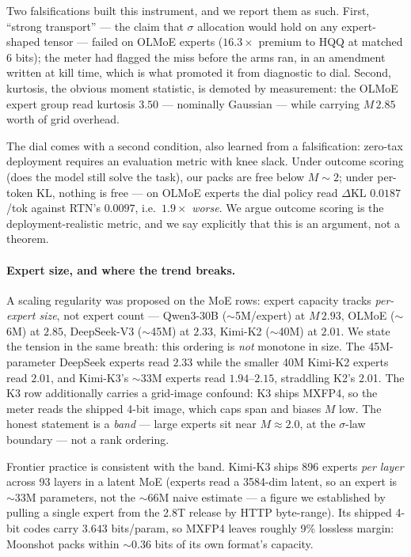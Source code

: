 \documentclass[11pt]{article}
\newcommand{\dkl}{\ensuremath{\Delta\mathrm{KL}}}
\begin{document}
Two falsifications built this instrument, and we report them as such. First,
``strong transport'' --- the claim that $\sigma$ allocation would hold on any
expert-shaped tensor --- failed on OLMoE experts ($16.3\times$ premium to HQQ at
matched 6 bits); the meter had flagged the miss before the arms ran, in an
amendment written at kill time, which is what promoted it from diagnostic to
dial. %
Second, kurtosis, the obvious moment statistic, is demoted by measurement: the
OLMoE expert group read kurtosis $3.50$ --- nominally Gaussian --- while
carrying $M\,2.85$ worth of grid overhead. %

The dial comes with a second condition, also learned from a falsification:
zero-tax deployment requires an evaluation metric with knee slack. Under outcome
scoring (does the model still solve the task), our packs are free below
$M \sim 2$; under per-token KL, nothing is free --- on OLMoE experts the dial
policy read \dkl{} $0.0187$/tok against RTN's $0.0097$, i.e.\ $1.9\times$
\emph{worse}. %
We argue outcome scoring is the deployment-realistic metric, and we say
explicitly that this is an argument, not a theorem.

\paragraph{Expert size, and where the trend breaks.}
A scaling regularity was proposed on the MoE rows: expert capacity tracks
\emph{per-expert size}, not expert count --- Qwen3-30B ($\sim$5M/expert) at
$M\,2.93$, OLMoE ($\sim$6M) at $2.85$, DeepSeek-V3 ($\sim$45M) at $2.33$,
Kimi-K2 ($\sim$40M) at $2.01$. %
We state the tension in the same breath: this ordering is \emph{not} monotone in
size. The 45M-parameter DeepSeek experts read $2.33$ while the smaller 40M
Kimi-K2 experts read $2.01$, and Kimi-K3's $\sim$33M experts read
$1.94$--$2.15$, straddling K2's 2.01. %
The K3 row additionally carries a grid-image confound: K3 ships MXFP4, so the
meter reads the shipped 4-bit image, which caps span and biases $M$ low. The
honest statement is a \emph{band} --- large experts sit near $M \approx 2.0$, at
the $\sigma$-law boundary --- not a rank ordering. %

Frontier practice is consistent with the band. Kimi-K3 ships 896 experts
\emph{per layer} across 93 layers %
in a latent MoE (experts read a 3584-dim latent, so an expert is $\sim$33M
parameters, not the $\sim$66M naive estimate --- a figure we established by
pulling a single expert from the 2.8T release by HTTP byte-range).
Its shipped 4-bit codes carry $3.643$ bits/param, so MXFP4 leaves roughly 9\%
lossless margin: Moonshot packs within $\sim 0.36$ bits of its own format's
capacity. %
\end{document}
